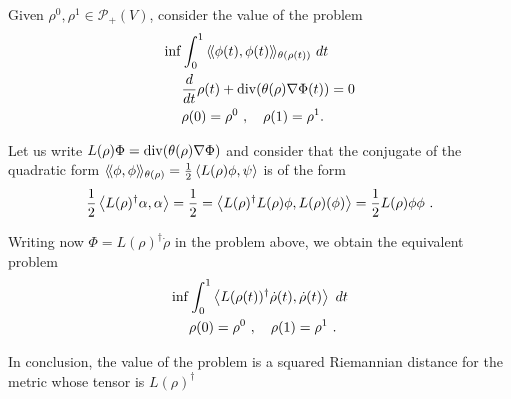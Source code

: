 \documentclass[12pt,a4paper]{amsart}
\begin{document}
Given $\rho^0, \rho^1 \in \mathcal P_+(V)$, consider the value of the problem
\begin{align*}
 \inf &\int_0^1 \Scalarat {\theta(\rho(t))} {\phi(t)}{\phi(t)} \ dt
 \\
 &\derivby t \rho(t) +  \Div(\theta(\rho)\nabla \Phi(t)) = 0 \\
 &\rho(0) = \rho^0 \ , \quad \rho(1) = \rho^1.
\end{align*}

Let us write $L(\rho)\Phi = \Div(\theta(\rho)\nabla \Phi)$ and
consider that the conjugate of the quadratic form
$\Scalarat {\theta(\rho)} \phi \phi = \frac 12 \scalarof {L(\rho)\phi}
\psi$ is of the form
\begin{equation*}
  \frac 12 \scalarof {L(\rho)^\dagger \alpha} {\alpha} = \frac12 =
  \scalarof {L(\rho)^\dagger L(\rho) \phi} {L(\rho)(\phi)} = \frac12
  {L(\rho) \phi} \phi \ . 
\end{equation*}

Writing now $\Phi = L(\rho)^\dagger \dot \rho$ in the problem above,
we obtain the equivalent problem
\begin{align*}
 \inf &\int_0^1 \scalarof {L(\rho(t))^\dagger \dot \rho(t)}{\dot \rho(t)} \ dt
 \\
 &\rho(0) = \rho^0 \ , \quad \rho(1) = \rho^1 \ .
\end{align*}

In conclusion, the value of the problem is a squared Riemannian
distance for the metric whose tensor is $L(\rho)^\dagger$
\end{document}
